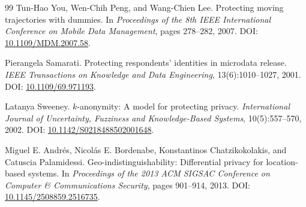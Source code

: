\documentclass[11pt,a4paper,oneside]{report}
\begin{document}
\begin{thebibliography}{99}
Tun-Hao You, Wen-Chih Peng, and Wang-Chien Lee.
\newblock Protecting moving trajectories with dummies.
\newblock In \emph{Proceedings of the 8th IEEE International Conference on Mobile Data Management}, pages 278--282, 2007.
\newblock DOI: \href{https://doi.org/10.1109/MDM.2007.58}{10.1109/MDM.2007.58}.

Pierangela Samarati.
\newblock Protecting respondents' identities in microdata release.
\newblock \emph{IEEE Transactions on Knowledge and Data Engineering}, 13(6):1010--1027, 2001.
\newblock DOI: \href{https://doi.org/10.1109/69.971193}{10.1109/69.971193}.

Latanya Sweeney.
\newblock $k$-anonymity: A model for protecting privacy.
\newblock \emph{International Journal of Uncertainty, Fuzziness and Knowledge-Based Systems}, 10(5):557--570, 2002.
\newblock DOI: \href{https://doi.org/10.1142/S0218488502001648}{10.1142/S0218488502001648}.

Miguel E. Andrés, Nicolás E. Bordenabe, Konstantinos Chatzikokolakis, and Catuscia Palamidessi.
\newblock Geo-indistinguishability: Differential privacy for location-based systems.
\newblock In \emph{Proceedings of the 2013 ACM SIGSAC Conference on Computer \& Communications Security}, pages 901--914, 2013.
\newblock DOI: \href{https://doi.org/10.1145/2508859.2516735}{10.1145/2508859.2516735}.

\end{thebibliography}
\end{document}
